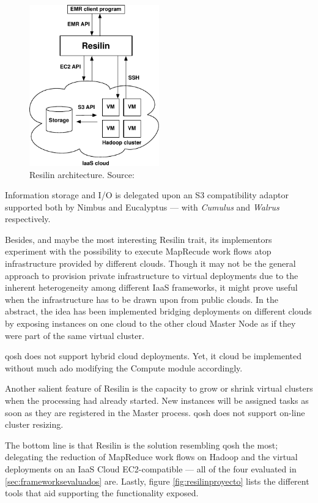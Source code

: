 \begin{figure}[tbp]
\begin{center}
\includegraphics[width=0.5\textwidth]{imagenes/035.pdf}
 \caption{Resilin architecture. Source: \cite{resilin}}
\label{fig:arquitecturaresilin}
\end{center}
\end{figure}

Information storage and I/O is delegated upon an S3 compatibility adaptor supported both by Nimbus and Eucalyptus --- with \emph{Cumulus} and \emph{Walrus} respectively.

Besides, and maybe the most interesting Resilin trait, its implementors experiment with the possibility to execute MapRecude work flows atop infrastructure provided by different clouds. Though it may not be the general approach to provision private infrastructure to virtual deployments due to the inherent heterogeneity among different IaaS frameworks, it might prove useful when the infrastructure has to be drawn upon from public clouds. In the abstract, the idea has been implemented bridging deployments on different clouds by exposing instances on one cloud to the other cloud Master Node as if they were part of the same virtual cluster.

qosh does not support hybrid cloud deployments. Yet, it cloud be implemented without much ado modifying the Compute module accordingly.

Another salient feature of Resilin is the capacity to grow or shrink virtual clusters when the processing had already started. New instances will be assigned tasks as soon as they are registered in the Master process. qosh does not support on-line cluster resizing.

The bottom line is that Resilin is the solution resembling qosh the most; delegating the reduction of MapReduce work flows on Hadoop and the virtual deployments on an IaaS Cloud EC2-compatible --- all of the four evaluated in \ref{sec:frameworksevaluados} are. Lastly, figure \ref{fig:resilinproyecto} lists the different tools that aid supporting the functionality exposed.

